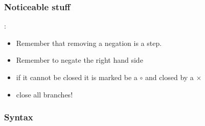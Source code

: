 	
	\subsubsection{Noticeable stuff}:
	\begin{itemize}
		\item Remember that removing a negation is a step.
		\item Remember to negate the right hand side
		\item if it cannot be closed it is marked be a $ \circ $ and closed by a $ \times $
		\item close all branches!
	\end{itemize}
	\subsubsection{Syntax}
	